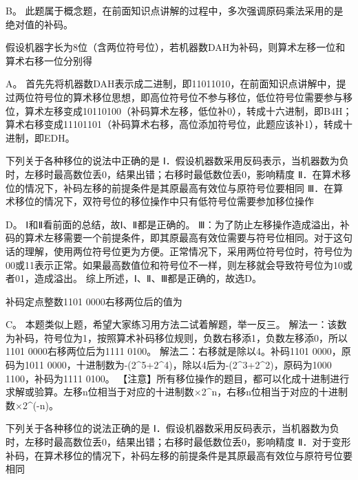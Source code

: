 \begin{solution}B。
此题属于概念题，在前面知识点讲解的过程中，多次强调原码乘法采用的是绝对值的补码。
\end{solution}
\question 假设机器字长为8位（含两位符号位），若机器数DAH为补码，则算术左移一位和算术右移一位分别得
\par{}
\begin{solution}A。
首先先将机器数DAH表示成二进制，即11011010，在前面知识点讲解中，提过两位符号位的算术移位思想，即高位符号位不参与移位，低位符号位需要参与移位，算术左移变成10110100（补码算术左移，低位补0），转成十六进制，即B4H；算术右移变成11101101（补码算术右移，高位添加符号位，此题应该补1），转成十进制，即EDH。
\end{solution}
\question 下列关于各种移位的说法中正确的是
Ⅰ．假设机器数采用反码表示，当机器数为负时，左移时最高数位丢0，结果出错；右移时最低数位丢0，影响精度
Ⅱ．在算术移位的情况下，补码左移的前提条件是其原最高有效位与原符号位要相同
Ⅲ．在算术移位的情况下，双符号位的移位操作中只有低符号位需要参加移位操作
\par{}
\begin{solution}D。 Ⅰ和Ⅱ看前面的总结，故Ⅰ、Ⅱ都是正确的。
Ⅲ：为了防止左移操作造成溢出，补码的算术左移需要一个前提条件，即其原最高有效位需要与符号位相同。对于这句话的理解，使用两位符号位更为方便。正常情况下，采用两位符号位时，符号位为00或11表示正常。如果最高数值位和符号位不一样，则左移就会导致符号位为10或者01，造成溢出。
综上所述，Ⅰ、Ⅱ、Ⅲ都是正确的，故选D。
\end{solution}
\question 补码定点整数1101 0000右移两位后的值为
\par{}
\begin{solution}C。 本题类似上题，希望大家练习用方法二试着解题，举一反三。
解法一：该数为补码，符号位为1，按照算术补码移位规则，负数右移添1，负数左移添0，所以1101
0000右移两位后为1111 0100。 解法二：右移就是除以4。补码1101
0000，原码为1011
0000，十进制数为-(2\^{}5+2\^{}4)，除以4后为-(2\^{}3+2\^{}2)，原码为1000
1100，补码为1111 0100。
【注意】所有移位操作的题目，都可以化成十进制进行求解或验算。左移n位相当于对应的十进制数×2\^{}n，右移n位相当于对应的十进制数×2\^{}(-n)。
\end{solution}
\question 下列关于各种移位的说法正确的是
Ⅰ．假设机器数采用反码表示，当机器数为负时，左移时最高数位丢0，结果出错；右移时最低数位丢0，影响精度
Ⅱ．对于变形补码，在算术移位的情况下，补码左移的前提条件是其原最高有效位与原符号位要相同
